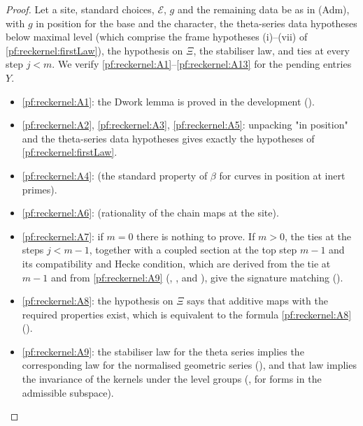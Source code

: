 \begin{proof}
Let a site, standard choices, $\mathcal E$, $g$ and the remaining data be as in (Adm), with $g$ in position for the base and the
character, the theta-series data hypotheses below maximal level (which comprise the frame hypotheses (i)--(vii) of
\cref{pf:reckernel:firstLaw}), the hypothesis on $\Xi$, the stabiliser law, and ties at every step $j<m$. We verify
\ref{pf:reckernel:A1}--\ref{pf:reckernel:A13} for the pending entries $Y$.
\begin{itemize}
\item \ref{pf:reckernel:A1}: the Dwork lemma is proved in the development
  ().
\item \ref{pf:reckernel:A2}, \ref{pf:reckernel:A3}, \ref{pf:reckernel:A5}: unpacking "in position" and the
  theta-series data hypotheses gives exactly the hypotheses of \cref{pf:reckernel:firstLaw}.
\item \ref{pf:reckernel:A4}:  (the standard property of $\beta$
  for curves in position at inert primes).
\item \ref{pf:reckernel:A6}:  (rationality
  of the chain maps at the site).
\item \ref{pf:reckernel:A7}: if $m=0$ there is nothing to prove. If $m>0$, the ties at the steps $j<m-1$, together with a
  coupled section at the top step $m-1$ and its compatibility and Hecke condition, which are derived from the tie at
  $m-1$ and from \ref{pf:reckernel:A9}
  (, , and ),
  give the signature matching ().
\item \ref{pf:reckernel:A8}: the hypothesis on $\Xi$ says that additive maps with the required properties exist, which is
  equivalent to the formula \ref{pf:reckernel:A8} ().
\item \ref{pf:reckernel:A9}: the stabiliser law for the theta series implies the corresponding law for the normalised
  geometric series (), and that law implies the invariance of the kernels
  under the level groups (, for forms in the admissible subspace).

\end{itemize}
\end{proof}
